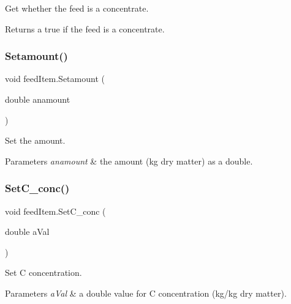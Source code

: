 Get whether the feed is a concentrate. 

\begin{DoxyReturn}{Returns}
a true if the feed is a concentrate. 
\end{DoxyReturn}
\mbox{\label{classfeed_item_a74cdd944c0859600cda02409e11d00a5}} 
\subsubsection{\texorpdfstring{Setamount()}{Setamount()}}
{\footnotesize\ttfamily void feed\+Item.\+Setamount (\begin{DoxyParamCaption}\item[{double}]{anamount }\end{DoxyParamCaption})\hspace{0.3cm}{\ttfamily [inline]}}



Set the amount. 


\begin{DoxyParams}{Parameters}
{\em anamount} & the amount (kg dry matter) as a double. \\
\hline
\end{DoxyParams}
\mbox{\label{classfeed_item_acc5a752b15d91d6d457f2c6fb68f3ce7}} 
\subsubsection{\texorpdfstring{SetC\_conc()}{SetC\_conc()}}
{\footnotesize\ttfamily void feed\+Item.\+Set\+C\+\_\+conc (\begin{DoxyParamCaption}\item[{double}]{a\+Val }\end{DoxyParamCaption})\hspace{0.3cm}{\ttfamily [inline]}}



Set C concentration. 


\begin{DoxyParams}{Parameters}
{\em a\+Val} & a double value for C concentration (kg/kg dry matter). \\
\hline
\end{DoxyParams}
\mbox{\label{classfeed_item_a2274207440dcfc25d1a839153bd3f7ff}} 
